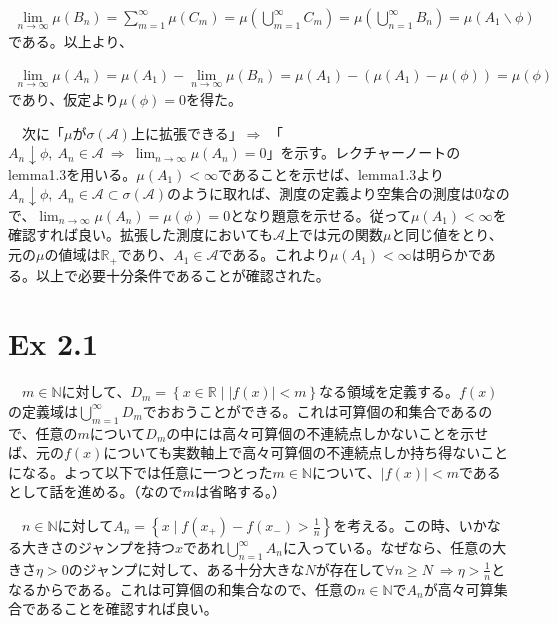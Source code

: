 \documentclass{article}
\begin{document}
\begin{align*}
	\lim_{n \to \infty} \mu \left( B_n \right) = \sum_{m = 1}^{\infty} \mu \left( C_m \right) = \mu \left( \bigcup_{m = 1}^{\infty} C_m \right) = \mu \left( \bigcup_{n = 1}^{\infty} B_n \right) = \mu \left( A_1 \backslash \phi \right)
\end{align*}
である。以上より、

\begin{align*}
	\lim_{n \to \infty} \mu \left( A_n \right) = \mu \left( A_1 \right) - \lim_{n \to \infty} \mu\left( B_n \right) = \mu \left( A_1 \right) - \left( \mu \left( A_1 \right) - \mu \left( \phi \right) \right) = \mu \left( \phi \right)
\end{align*}
であり、仮定より$\mu \left( \phi \right) = 0$を得た。


　次に「$\mu$が$\sigma\left( \mathcal{A} \right)$上に拡張できる」$\Rightarrow$ 「$A_n \downarrow \phi,\ A_n \in \mathcal{A}\ \Rightarrow\ \lim_{n \to \infty} \mu \left( A_n \right) = 0$」を示す。レクチャーノートのlemma1.3を用いる。$\mu \left( A_1 \right) < \infty$であることを示せば、lemma1.3より$A_n \downarrow \phi,\ A_n \in \mathcal{A} \subset \sigma\left(\mathcal{A} \right)$のように取れば、測度の定義より空集合の測度は$0$なので、$\lim_{n \to \infty} \mu \left( A_n \right) = \mu \left( \phi \right) = 0$となり題意を示せる。従って$\mu \left( A_1 \right) < \infty$を確認すれば良い。拡張した測度においても$\mathcal{A}$上では元の関数$\mu$と同じ値をとり、元の$\mu$の値域は$\mathbb{R}_{+}$であり、$A_1 \in \mathcal{A}$である。これより$\mu \left( A_1 \right) < \infty$は明らかである。以上で必要十分条件であることが確認された。

\section{Ex 2.1}
　$m \in \mathbb{N}$に対して、$D_m = \left\{ x \in \mathbb{R}\mid | f(x) | < m\right\}$なる領域を定義する。$f(x)$の定義域は$\bigcup_{m = 1}^{\infty} D_m$でおおうことができる。これは可算個の和集合であるので、任意の$m$について$D_m$の中には高々可算個の不連続点しかないことを示せば、元の$f(x)$についても実数軸上で高々可算個の不連続点しか持ち得ないことになる。よって以下では任意に一つとった$m \in \mathbb{N}$について、$| f(x) | < m$であるとして話を進める。（なので$m$は省略する。）

　$n \in \mathbb{N}$に対して$A_n = \left\{ x \mid f(x_{+}) - f(x_{-}) > \frac{1}{n} \right\}$を考える。この時、いかなる大きさのジャンプを持つ$x$であれ$\bigcup_{n = 1}^{\infty} A_n$に入っている。なぜなら、任意の大きさ$\eta>0$のジャンプに対して、ある十分大きな$N$が存在して$\forall n \geq N\ \Rightarrow \eta > \frac{1}{n}$となるからである。これは可算個の和集合なので、任意の$n \in \mathbb{N}$で$A_n$が高々可算集合であることを確認すれば良い。
\end{document}
